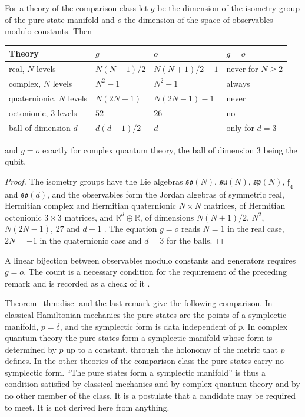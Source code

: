 \begin{proposition}\label{prop:count}
For a theory of the comparison class let $g$ be the dimension of the isometry group of the pure-state manifold and $o$ the dimension of the space of observables modulo constants. Then
\begin{center}\small
\begin{tabular}{@{}llll@{}}\toprule
Theory & $g$ & $o$ & $g=o$\\\midrule
real, $N$ levels & $N(N-1)/2$ & $N(N+1)/2-1$ & never for $N\ge2$\\
complex, $N$ levels & $N^2-1$ & $N^2-1$ & always\\
quaternionic, $N$ levels & $N(2N+1)$ & $N(2N-1)-1$ & never\\
octonionic, $3$ levels & $52$ & $26$ & no\\
ball of dimension $d$ & $d(d-1)/2$ & $d$ & only for $d=3$\\\bottomrule
\end{tabular}
\end{center}
and $g=o$ exactly for complex quantum theory, the ball of dimension $3$ being the qubit.
\end{proposition}
\begin{proof}
The isometry groups have the Lie algebras $\mathfrak{so}(N)$, $\mathfrak{su}(N)$, $\mathfrak{sp}(N)$, $\mathfrak{f}_4$ and $\mathfrak{so}(d)$, and the observables form the Jordan algebras of symmetric real, Hermitian complex and Hermitian quaternionic $N\times N$ matrices, of Hermitian octonionic $3\times3$ matrices, and $\mathbb{R}^d\oplus\mathbb{R}$, of dimensions $N(N+1)/2$, $N^2$, $N(2N-1)$, $27$ and $d+1$ \cite{bmu,baez}. The equation $g=o$ reads $N=1$ in the real case, $2N=-1$ in the quaternionic case and $d=3$ for the balls.
\end{proof}
A linear bijection between observables modulo constants and generators requires $g=o$. The count is a necessary condition for the requirement of the preceding remark and is recorded as a check of it \cite{comp2}.

Theorem~\ref{thm:disc} and the last remark give the following comparison. In classical Hamiltonian mechanics the pure states are the points of a symplectic manifold, $p=\delta$, and the symplectic form is data independent of $p$. In complex quantum theory the pure states form a symplectic manifold whose form is determined by $p$ up to a constant, through the holonomy of the metric that $p$ defines. In the other theories of the comparison class the pure states carry no symplectic form. ``The pure states form a symplectic manifold'' is thus a condition satisfied by classical mechanics and by complex quantum theory and by no other member of the class. It is a postulate that a candidate may be required to meet. It is not derived here from anything.

